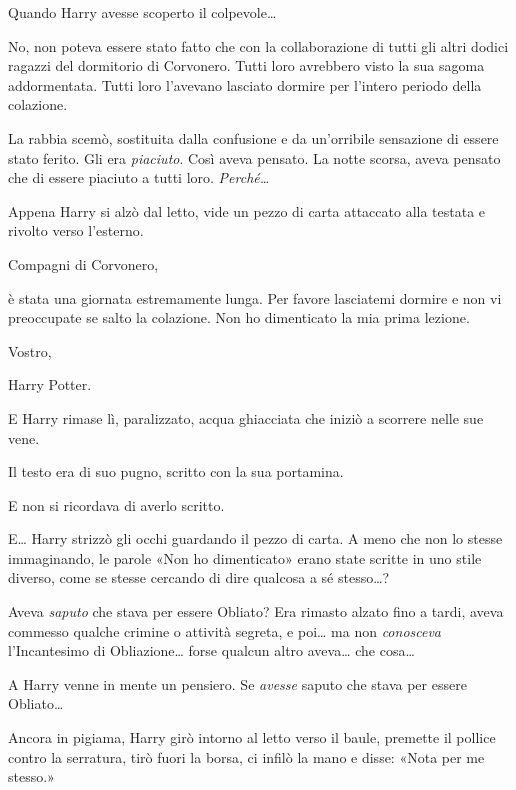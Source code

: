 Quando Harry avesse scoperto il colpevole…

No, non poteva essere stato fatto che con la collaborazione di tutti gli altri dodici ragazzi del dormitorio di Corvonero. Tutti loro avrebbero visto la sua sagoma addormentata. Tutti loro l’avevano lasciato dormire per l’intero periodo della colazione.

La rabbia scemò, sostituita dalla confusione e da un’orribile sensazione di essere stato ferito. Gli era \textit{piaciuto}. Così aveva pensato. La notte scorsa, aveva pensato che di essere piaciuto a tutti loro. \textit{Perché…}

Appena Harry si alzò dal letto, vide un pezzo di carta attaccato alla testata e rivolto verso l’esterno.

\vspace{1em}
\begin{addmargin}[3em]{3em}%
\begin{itpars}
Compagni di Corvonero,

è stata una giornata estremamente lunga. Per favore lasciatemi dormire e non vi preoccupate se salto la colazione. Non ho dimenticato la mia prima lezione.

Vostro,

Harry Potter.
\end{itpars}
\end{addmargin}
\vspace{1em}

E Harry rimase lì, paralizzato, acqua ghiacciata che iniziò a scorrere nelle sue vene.

Il testo era di suo pugno, scritto con la sua portamina.

E non si ricordava di averlo scritto.

E… Harry strizzò gli occhi guardando il pezzo di carta. A meno che non lo stesse immaginando, le parole «Non ho dimenticato» erano state scritte in uno stile diverso, come se stesse cercando di dire qualcosa a sé stesso…?

Aveva \textit{saputo} che stava per essere Obliato? Era rimasto alzato fino a tardi, aveva commesso qualche crimine o attività segreta, e poi… ma non \textit{conosceva} l’Incantesimo di Obliazione… forse qualcun altro aveva… che cosa…

A Harry venne in mente un pensiero. Se \textit{avesse} saputo che stava per essere Obliato…

Ancora in pigiama, Harry girò intorno al letto verso il baule, premette il pollice contro la serratura, tirò fuori la borsa, ci infilò la mano e disse: «Nota per me stesso.»

